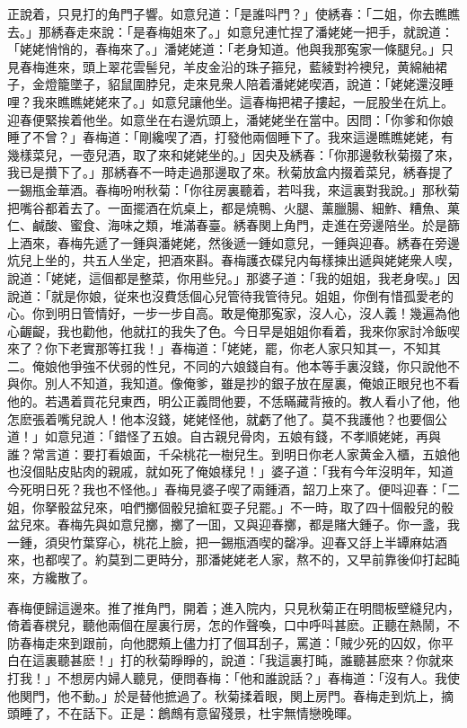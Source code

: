 正說着，只見打的角門子響。如意兒道：「是誰呌門？」使綉春：「二姐，你去瞧瞧去。」那綉春走來說：「是春梅姐來了。」如意兒連忙捏了潘姥姥一把手，就說道：「姥姥悄悄的，春梅來了。」潘姥姥道：「老身知道。他與我那寃家一條腿兒。」只見春梅進來，頭上翠花雲髻兒，羊皮金沿的珠子箍兒，藍綾對衿襖兒，黄綿紬裙子，金燈籠墜子，貂鼠圍脖兒，走來見衆人陪着潘姥姥喫酒，說道：「姥姥還沒睡哩？我來瞧瞧姥姥來了。」如意兒讓他坐。這春梅把裙子摟起，一屁股坐在炕上。迎春便緊挨着他坐。如意坐在右邊炕頭上，潘姥姥坐在當中。因問：「你爹和你娘睡了不曾？」春梅道：「剛纔喫了酒，打發他兩個睡下了。我來這邊瞧瞧姥姥，有幾樣菜兒，一壺兒酒，取了來和姥姥坐的。」因央及綉春：「你那邊敎秋菊掇了來，我已是攢下了。」那綉春不一時走過那邊取了來。秋菊放盒内掇着菜兒，綉春提了一錫瓶金華酒。春梅吩咐秋菊：「你往房裏聽着，若呌我，來這裏對我說。」那秋菊把嘴谷都着去了。一面擺酒在炕桌上，都是燒鴨、火腿、薰臘腸、細鮓、糟魚、菓仁、鹹酸、蜜食、海味之類，堆滿春臺。綉春関上角門，走進在旁邊陪坐。於是篩上酒來，春梅先遞了一鍾與潘姥姥，然後遞一鍾如意兒，一鍾與迎春。綉春在旁邊炕兒上坐的，共五人坐定，把酒來斟。春梅護衣碟兒内每樣揀出遞與姥姥衆人喫，說道：「姥姥，這個都是整菜，你用些兒。」那婆子道：「我的姐姐，我老身喫。」因說道：「就是你娘，従來也沒費恁個心兒管待我管待兒。姐姐，你倒有惜孤愛老的心。你到明日管情好，一步一步自高。敢是俺那寃家，沒人心，沒人義！幾遍為他心齷齪，我也勸他，他就扛的我失了色。今日早是姐姐你看着，我來你家討冷飯喫來了？你下老實那等扛我！」春梅道：「姥姥，罷，你老人家只知其一，不知其二。俺娘他爭強不伏弱的性兒，不同的六娘錢自有。他本等手裏沒錢，你只說他不與你。別人不知道，我知道。像俺爹，雖是抄的銀子放在屋裏，俺娘正眼兒也不看他的。若遇着買花兒東西，明公正義問他要，不恁瞞藏背掖的。教人看小了他，他怎麽張着嘴兒說人！他本沒錢，姥姥怪他，就虧了他了。莫不我護他？也要個公道！」如意兒道：「錯怪了五娘。自古親兒骨肉，五娘有錢，不孝順姥姥，再與誰？常言道：要打看娘面，千朵桃花一樹兒生。到明日你老人家黄金入櫃，五娘他也沒個貼皮貼肉的親戚，就如死了俺娘樣兒！」婆子道：「我有今年沒明年，知道今死明日死？我也不怪他。」春梅見婆子喫了兩鍾酒，韶刀上來了。便呌迎春：「二姐，你拏骰盆兒來，咱們擲個骰兒搶紅耍子兒罷。」不一時，取了四十個骰兒的骰盆兒來。春梅先與如意兒擲，擲了一囬，又與迎春擲，都是賭大鍾子。你一盞，我一鍾，須臾竹葉穿心，桃花上臉，把一錫瓶酒喫的罄凈。迎春又㧱上半罈麻姑酒來，也都喫了。約莫到二更時分，那潘姥姥老人家，熬不的，又早前靠後仰打起盹來，方纔散了。

春梅便歸這邊來。推了推角門，開着；進入院内，只見秋菊正在明間板壁縫兒内，倚着春櫈兒，聽他兩個在屋裏行房，怎的作聲喚，口中呼呌甚麽。正聽在熱鬧，不防春梅走來到跟前，向他腮頰上儘力打了個耳刮子，罵道：「賊少死的囚奴，你平白在這裏聽甚麽！」打的秋菊睜睜的，說道：「我這裏打盹，誰聽甚麽來？你就來打我！」不想房内婦人聽見，便問春梅：「他和誰說話？」春梅道：「沒有人。我使他関門，他不動。」於是替他摭過了。秋菊揉着眼，関上房門。春梅走到炕上，摘頭睡了，不在話下。正是：鶬鷓有意留殘景，杜宇無情戀晚暉。

